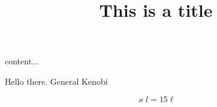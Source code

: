 \documentclass[]{article}
\begin{document}
	content...

\title{This is a title}

\maketitle

Hello there. General Kenobi

\begin{equation}\label{key}
	\varkappa l = 15 \ell
\end{equation}
\end{document}

